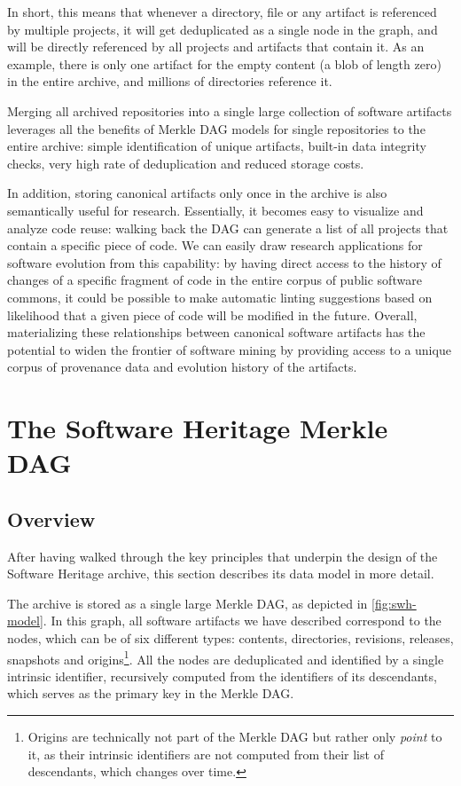 In short, this means that whenever a directory, file or any artifact is
referenced by multiple projects, it will get deduplicated as a single node in
the graph, and will be directly referenced by all projects and artifacts
that contain it. As an example, there is only one artifact for the empty
content (a blob of length zero) in the entire archive, and millions of
directories reference it.

Merging all archived repositories into a single large collection of software
artifacts leverages all the benefits of Merkle \gls{DAG} models for single
repositories to the entire archive: simple identification of unique artifacts,
built-in data integrity checks, very high rate of deduplication and reduced
storage costs.

In addition, storing canonical artifacts only once in the archive is also
semantically useful for research. Essentially, it becomes easy to visualize
and analyze code reuse: walking back the \gls{DAG} can generate a list of all
projects that contain a specific piece of code.
We can easily draw research applications for software evolution from this
capability: by having direct access to the history of changes of a specific
fragment of code in the entire corpus of public software commons, it could be
possible to make automatic linting suggestions based on likelihood that a given
piece of code will be modified in the future. Overall, materializing these
relationships between canonical software artifacts has the potential to widen
the frontier of software mining by providing access to a unique corpus of
provenance data and evolution history of the artifacts.


\section{The Software Heritage Merkle DAG}

\subsection{Overview}

After having walked through the key principles that underpin the design of the
Software Heritage archive, this section describes its data model in more
detail.

The archive is stored as a single large Merkle \gls{DAG}, as depicted
in \cref{fig:swh-model}. In this graph, all software artifacts we have
described correspond to the nodes, which can be of six different types:
contents, directories, revisions, releases, snapshots and
origins\footnote{Origins are technically not part of the Merkle DAG but rather
only \emph{point} to it, as their intrinsic identifiers are not computed from
their list of descendants, which changes over time.}.
All the nodes are deduplicated and identified by a single intrinsic
identifier, recursively computed from the identifiers of its descendants, which
serves as the primary key in the Merkle \gls{DAG}.

